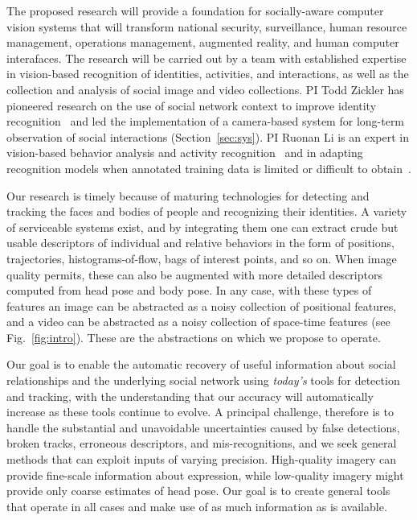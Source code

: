 The proposed research will provide a foundation for socially-aware computer vision systems that will transform national security, surveillance, human resource management, operations management, augmented reality, and human computer interafaces. The research will be carried out by a team with established expertise in vision-based recognition of identities, activities, and interactions, as well as the collection and analysis of social image and video collections. PI Todd Zickler has pioneered research on the use of social network context to improve identity recognition~\cite{Stone2008,Stone2010} and led the implementation of a camera-based system for long-term observation of social interactions (Section~\ref{sec:sys}). PI Ruonan Li is an expert in vision-based behavior analysis and activity recognition~\cite{groupdet2013,LiIJCV2012,LiPAMI2012,Li2010} and in adapting recognition models when annotated training data is limited or difficult to obtain~\cite{LiZickler2012,Li2011}. 

 Our research is timely because of maturing technologies for detecting and tracking the faces and bodies of people and recognizing their identities. A variety of serviceable systems exist, and by integrating them one can extract crude but usable descriptors of individual and relative behaviors in the form of positions, trajectories, histograms-of-flow, bags of interest points, and so on. When image quality permits, these can also be augmented with more detailed descriptors computed from head pose and body pose. In any case, with these types of features an image can be abstracted as a noisy collection of positional features, and a video can be abstracted as a noisy collection of space-time features (see Fig.~\ref{fig:intro}). These are the abstractions on which we propose to operate.

 Our goal is to enable the automatic recovery of useful information about social relationships and the underlying social network using \emph{today's} tools for detection and tracking, with the understanding that our accuracy will automatically increase as these tools continue to evolve. A principal challenge, therefore is to handle the substantial and unavoidable uncertainties caused by false detections, broken tracks, erroneous descriptors, and mis-recognitions, and we seek general methods that can exploit inputs of varying precision. High-quality imagery can provide fine-scale information about expression, while low-quality imagery might provide only coarse estimates of head pose. Our goal is to create general tools that operate in all cases and make use of as much information as is available.


